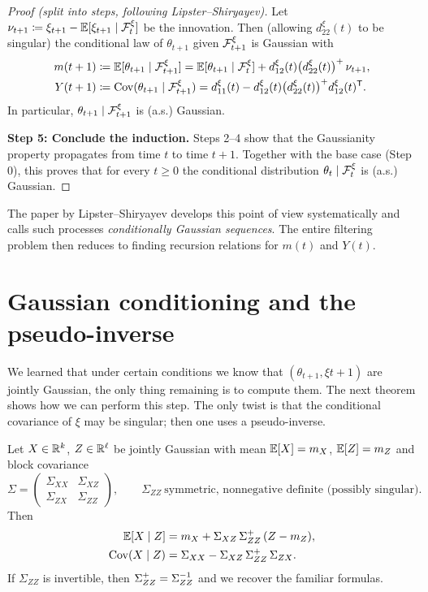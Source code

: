 \begin{proof}[Proof (split into steps, following Lipster--Shiryayev)]
Let $\nu_{t+1}\coloneqq \xi_{t+1}-\mathbb{E}[\xi_{t+1}\mid \mathcal{F}_t^\xi]$ be the innovation.
Then (allowing $d_{22}^\xi(t)$ to be singular) the conditional law of $\theta_{t+1}$ given $\mathcal{F}_{t+1}^\xi$ is Gaussian with
\begin{align*}
m(t+1)
&\coloneqq \mathbb{E}[\theta_{t+1}\mid \mathcal{F}_{t+1}^\xi]
= \mathbb{E}[\theta_{t+1}\mid \mathcal{F}_t^\xi] + d_{12}^\xi(t)\bigl(d_{22}^\xi(t)\bigr)^{+}\,\nu_{t+1},\\
Y(t+1)
&\coloneqq \mathrm{Cov}(\theta_{t+1}\mid \mathcal{F}_{t+1}^\xi)
= d_{11}^\xi(t) - d_{12}^\xi(t)\bigl(d_{22}^\xi(t)\bigr)^{+} d_{12}^\xi(t)^{\mathsf{T}}.
\end{align*}
In particular, $\theta_{t+1}\mid \mathcal{F}_{t+1}^\xi$ is (a.s.) Gaussian.

\medskip
\noindent\textbf{Step 5: Conclude the induction.}
Steps 2--4 show that the Gaussianity property propagates from time $t$ to time $t+1$.
Together with the base case (Step 0), this proves that for every $t\ge 0$ the conditional distribution
$\theta_t\mid \mathcal{F}_t^\xi$ is (a.s.) Gaussian.
\end{proof}


\begin{remark}
The paper by Lipster--Shiryayev develops this point of view systematically and calls such processes
\emph{conditionally Gaussian sequences}.
The entire filtering problem then reduces to finding recursion relations for \(m(t)\) and \(Y(t)\).
\end{remark}

\section{Gaussian conditioning and the pseudo-inverse}

We learned that under certain conditions we know that $(\theta_{t+1},\xi{t+1})$ are jointly Gaussian, the only thing remaining is to compute them. The next theorem shows how we can perform this step.
The only twist is that the conditional covariance of \(\xi\) may be singular; then one uses a pseudo-inverse.

\begin{theorem}
\label{thm:gaussian_regression}
Let \(X\in\mathbb{R}^k\), \(Z\in\mathbb{R}^\ell\) be jointly Gaussian with mean
\(\mathbb{E}[X]=m_X\), \(\mathbb{E}[Z]=m_Z\) and block covariance
\[
\Sigma=
\begin{pmatrix}
\Sigma_{XX} & \Sigma_{XZ}\\
\Sigma_{ZX} & \Sigma_{ZZ}
\end{pmatrix},
\qquad \Sigma_{ZZ}\ \text{symmetric, nonnegative definite (possibly singular)}.
\]
Then
\begin{align*}
\mathbb{E}[X\mid Z] &= m_X + \Sigma_{XZ}\,\Sigma_{ZZ}^{+}\,(Z-m_Z),\\
\mathrm{Cov}(X\mid Z) &= \Sigma_{XX} - \Sigma_{XZ}\,\Sigma_{ZZ}^{+}\,\Sigma_{ZX}.
\end{align*}
If \(\Sigma_{ZZ}\) is invertible, then \(\Sigma_{ZZ}^{+}=\Sigma_{ZZ}^{-1}\) and we recover the familiar formulas.
\end{theorem}

